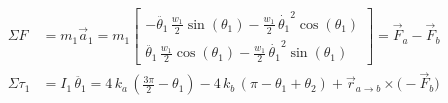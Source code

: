 \documentclass[11pt]{article}
\begin{document}
\pagestyle{empty}
\begin{align*}
  \Sigma F &= m_1 \vec{a}_1
    = m_1
    \begin{bmatrix}
      -\ddot{\theta_1}\,\tfrac{w_1}{2}\sin(\theta_1)
        - \tfrac{w_1}{2}\,\dot{\theta_1}^2\cos(\theta_1) \\[0.5ex]
      \ddot{\theta_1}\,\tfrac{w_1}{2}\cos(\theta_1)
        - \tfrac{w_1}{2}\,\dot{\theta_1}^2\sin(\theta_1)
    \end{bmatrix}
    = \vec{F}_{a} - \vec{F}_{b} \\[4ex]
  \Sigma \tau_1
    &= I_1\,\ddot{\theta_1}
    = 4\,k_{a}\,(\frac{3\pi}{2} - \theta_1)
      - 4\,k_{b}\,(\pi - \theta_1 + \theta_2)
      + \vec{r}_{a \rightarrow b}\times\bigl(-\vec{F}_b)
\end{align*}
\end{document}
